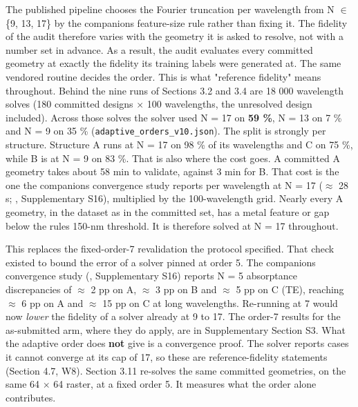 \documentclass[11pt,a4paper]{article}
\begin{document}
The published pipeline chooses the Fourier truncation per wavelength from N \ensuremath{\in} \{9, 13, 17\}
by the companion\textquotesingle s feature-size rule rather than fixing it. The fidelity of the audit
therefore varies with the geometry it is asked to resolve, not with a number set in
advance. As a result, the audit evaluates every committed geometry at exactly the fidelity
its training labels were generated at. The same vendored routine decides the order. This
is what "reference fidelity" means throughout. Behind the nine runs of Sections 3.2 and
3.4 are 18 000 wavelength solves (180 committed designs \ensuremath{\times} 100 wavelengths, the unresolved
design included). Across those solves the solver used N = 17 on \textbf{59 \%}, N = 13 on 7 \%
and N = 9 on 35 \% (\texttt{adaptive\_\allowbreak{}orders\_\allowbreak{}v10.\allowbreak{}json}). The split is strongly per structure.
Structure A runs at N = 17 on 98 \% of its wavelengths and C on 75 \%, while B is at N = 9
on 83 \%. That is also where the cost goes. A committed A geometry takes about 58 min to
validate, against 3 min for B. That cost is the one the companion\textquotesingle s convergence study
reports per wavelength at N = 17 (\ensuremath{\approx} 28 s; \cite{choi20261}, Supplementary S16), multiplied by the
100-wavelength grid. Nearly every A geometry, in the dataset as in the committed set, has
a metal feature or gap below the rule\textquotesingle s 150-nm threshold. It is therefore solved at N = 17
throughout.

This replaces the fixed-order-7 revalidation the protocol specified. That check existed to
bound the error of a solver pinned at order 5. The companion\textquotesingle s convergence study (\cite{choi20261},
Supplementary S16) reports N = 5 absorptance discrepancies of \ensuremath{\approx} 2 pp on A, \ensuremath{\approx} 3 pp on B and
\ensuremath{\approx} 5 pp on C (TE), reaching \ensuremath{\approx} 6 pp on A and \ensuremath{\approx} 15 pp on C at long wavelengths. Re-running at
7 would now \emph{lower} the fidelity of a solver already at 9 to 17. The order-7 results for
the as-submitted arm, where they do apply, are in Supplementary Section S3. What the
adaptive order does \textbf{not} give is a convergence proof. The solver reports cases it
cannot converge at its cap of 17, so these are reference-fidelity statements (Section 4.7,
W8). Section 3.11 re-solves the same committed geometries, on the same 64 \ensuremath{\times} 64 raster, at
a fixed order 5. It measures what the order alone contributes.
\end{document}
